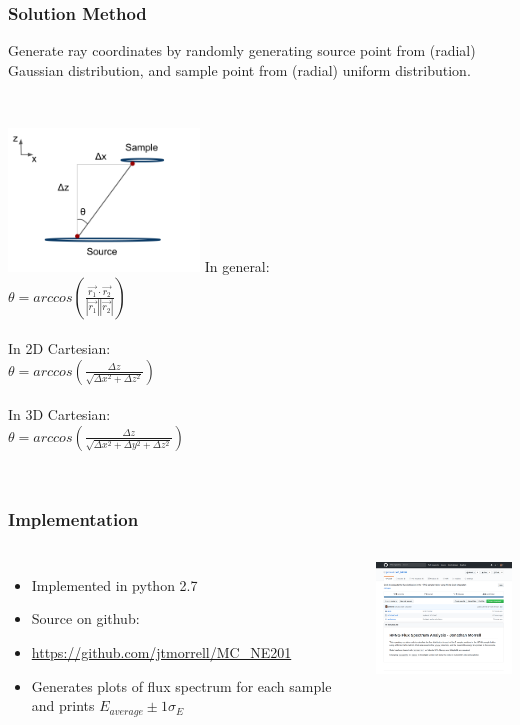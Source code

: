 \documentclass[12pt,xcolor=dvipsnames]{beamer}
\begin{document}
\begin{frame}
\frametitle{Solution Method}
Generate ray coordinates by randomly generating source point from (radial) Gaussian distribution, and sample point from (radial) uniform distribution.\\
\ \ \\
\begin{columns}[c]
\column{2in}
\includegraphics[width=2in]{MC201_Graphic.png}
\column{2in}
In general:\\
$\theta = arccos(\frac{\vec{r_1}\cdot\vec{r_2}}{|\vec{r_1}||\vec{r_2}|})$\\
\ \ \\
In 2D Cartesian:\\
$\theta = arccos(\frac{\Delta z}{\sqrt{\Delta x^2 + \Delta z^2}})$\\
\ \ \\
In 3D Cartesian:\\
$\theta = arccos(\frac{\Delta z}{\sqrt{\Delta x^2 + \Delta y^2 + \Delta z^2}})$\\
\ \ \\
\end{columns}
\end{frame}

\begin{frame}
\frametitle{Implementation}
\begin{columns}[c]
\column{2in}
\begin{itemize}
\item Implemented in python 2.7
\item Source on github:
\item \url{https://github.com/jtmorrell/MC_NE201}
\item Generates plots of flux spectrum for each sample and prints $E_{average}\pm 1\sigma_E$
\end{itemize}
\column{2in}
\includegraphics[width=2in]{github.png}
\end{columns}
\end{frame}
\end{document}
